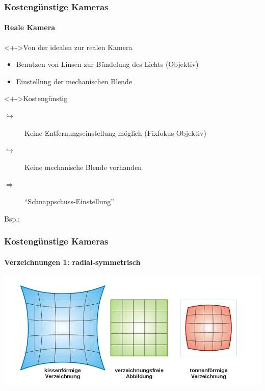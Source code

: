 \documentclass{beamer}
\begin{document}

\begin{frame}
	\frametitle{Kosteng\"unstige Kameras}\framesubtitle{Reale Kamera}
	\begin{block}<+->{Von der idealen zur realen Kamera}
		\begin{itemize}
		  \item Benutzen von Linsen zur B\"undelung des Lichts (Objektiv)
		  \item Einstellung der mechanischen Blende
		\end{itemize}
	\end{block}
	
	\begin{block}<+->{Kosteng\"unstig}
		\begin{description}
		  \item[$\hookrightarrow$] Keine Entfernungseinstellung m\"oglich (Fixfokus-Objektiv)
		  \item[$\hookrightarrow$] Keine mechanische Blende vorhanden
		  \item[$\Rightarrow$] ``Schnappschuss-Einstellung''
		  \item[Bsp.:] \color{green!60!black}{Webcams}
		\end{description}
	\end{block}
\end{frame}


\begin{frame}
	\frametitle{Kosteng\"unstige Kameras}\framesubtitle{Verzeichnungen 1: radial-symmetrisch}
	\centering
	\includegraphics[width=1\textwidth]{bilder/Verzeichnung.png}\\
	\hskip110pt \footnotesize \color{gray}{(Author: Fantagu)}
\end{frame}
\end{document}
